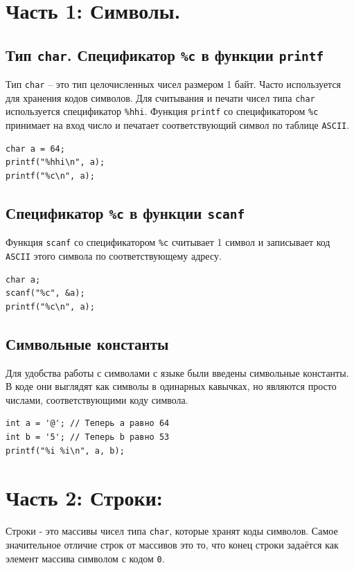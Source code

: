 \documentclass{article}
\begin{document}
\section*{Часть 1: Символы.}
\subsection*{Тип \texttt{char}. Спецификатор \texttt{\%c} в функции \texttt{printf}}
Тип \texttt{char} -- это тип целочисленных чисел размером 1 байт. Часто используется для хранения кодов символов.
Для считывания и печати чисел типа \texttt{char} используется спецификатор \texttt{\%hhi}.
Функция \texttt{printf} со спецификатором \texttt{\%c} принимает на вход число и печатает соответствующий символ по таблице \texttt{ASCII}.
\begin{lstlisting}
char a = 64;
printf("%hhi\n", a);
printf("%c\n", a);
\end{lstlisting}



\subsection*{Спецификатор \texttt{\%c} в функции \texttt{scanf}}
Функция \texttt{scanf} со спецификатором \texttt{\%c} считывает 1 символ и записывает код \texttt{ASCII} этого символа по соответствующему адресу.
\begin{lstlisting}
char a; 
scanf("%c", &a);
printf("%c\n", a);
\end{lstlisting}


\subsection*{Символьные константы}
Для удобства работы с символами с языке были введены символьные константы. В коде они выглядят как символы в одинарных кавычках, но являются просто числами, соответствующими коду символа.
\begin{lstlisting}
int a = '@'; // Теперь a равно 64
int b = '5'; // Теперь b равно 53
printf("%i %i\n", a, b);
\end{lstlisting}



\newpage
\section*{Часть 2: Строки:}
Строки - это массивы чисел типа \texttt{char}, которые хранят коды символов. Самое значительное отличие строк от массивов это то, что конец строки задаётся как элемент массива символом с кодом \texttt{0}. 
\end{document}
